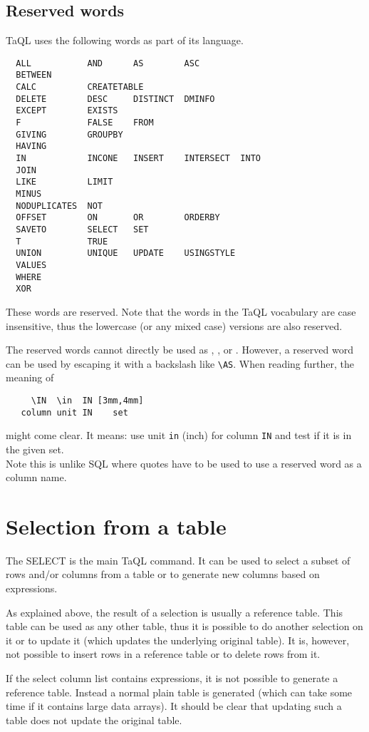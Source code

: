 \subsection{\label{TAQL:RESERVEDWORDS}Reserved words}
TaQL uses the following words as part of its language.
\begin{verbatim}
  ALL           AND      AS        ASC
  BETWEEN 
  CALC          CREATETABLE
  DELETE        DESC     DISTINCT  DMINFO
  EXCEPT        EXISTS
  F             FALSE    FROM
  GIVING        GROUPBY
  HAVING
  IN            INCONE   INSERT    INTERSECT  INTO
  JOIN
  LIKE          LIMIT
  MINUS
  NODUPLICATES  NOT
  OFFSET        ON       OR        ORDERBY
  SAVETO        SELECT   SET
  T             TRUE
  UNION         UNIQUE   UPDATE    USINGSTYLE
  VALUES 
  WHERE
  XOR
\end{verbatim}
These words are reserved. Note that the words in the TaQL vocabulary
are case insensitive, 
thus the lowercase (or any mixed case) versions are also reserved.

The reserved words cannot directly be used as
,
, or 
.
However, a reserved word can be used by escaping it with a backslash like
\verb+\+\texttt{AS}. When reading further, the meaning of
\begin{verbatim}
     \IN  \in  IN [3mm,4mm]
   column unit IN    set
\end{verbatim}
might come clear. It means: use unit \texttt{in} (inch) for column
\texttt{IN} and test if it is in the given set. 
\\Note this is unlike SQL where quotes have to be used to use a
reserved word as a column name.

\section{Selection from a table}
The SELECT is the main TaQL command. It can be used to select a subset
of rows and/or columns from a table or to generate new columns based
on expressions.

As explained above, the result of a selection is usually a reference
table. This table can be used as any other table, thus it is possible
to do another selection on it or to update it (which updates the
underlying original table). It is, however, not possible to insert
rows in a reference table or to delete rows from it.

If the select column list contains expressions, it is not possible to
generate a reference table. Instead a normal plain table is generated
(which can take some time if it contains large data arrays).
It should be clear that updating such a table does not update the
original table.

